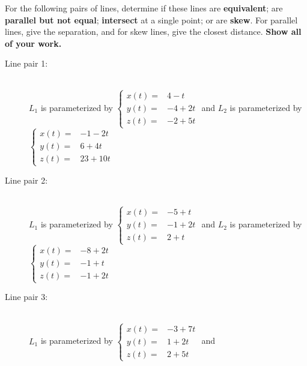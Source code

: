 \documentclass{article}
\begin{document}
For the following pairs of lines, determine if these lines are \textbf{equivalent}; are \textbf{parallel but not equal}; \textbf{intersect} at a single point; or are \textbf{skew}. For parallel lines, give the separation, and for skew lines, give the closest distance. \textbf{Show all of your work.}

\begin{description}
\item[Line pair 1:] ~ \\
\(L_1\) is parameterized by \(\left\{\begin{array}{rl} x(t) = & 4 - t \\ y(t) = & -4 + 2t \\ z(t) = & -2 + 5t \end{array}\right.\) and
\(L_2\) is parameterized by \(\left\{\begin{array}{rl} x(t) = & -1 - 2t \\ y(t) = & 6 + 4t \\ z(t) = & 23 + 10t \end{array}\right.\)
\item[Line pair 2:] ~ \\
\(L_1\) is parameterized by \(\left\{\begin{array}{rl} x(t) = & -5 + t \\ y(t) = & -1 + 2t \\ z(t) = & 2 + t \end{array}\right.\) and
\(L_2\) is parameterized by \(\left\{\begin{array}{rl} x(t) = & -8 + 2t \\ y(t) = & -1 + t \\ z(t) = & -1 + 2t \end{array}\right.\)
\item[Line pair 3:] ~ \\
\(L_1\) is parameterized by \(\left\{\begin{array}{rl} x(t) = & -3 + 7t \\ y(t) = & 1 + 2t \\ z(t) = & 2 + 5t \end{array}\right.\) and

\end{description}
\end{document}
